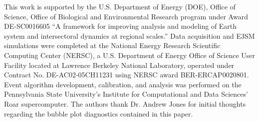 \documentclass[nhess, manuscript]{copernicus}
\begin{document}

\begin{acknowledgements}
This work is supported by the U.S. Department of Energy (DOE), Office of Science, Office of Biological and Environmental Research program under Award DE-SC0016605 ``A framework for improving analysis and modeling of Earth system and intersectoral dynamics at regional scales.'' Data acquisition and E3SM simulations were completed at the National Energy Research Scientific Computing Center (NERSC), a U.S. Department of Energy Office of Science User Facility located at Lawrence Berkeley National Laboratory, operated under Contract No. DE-AC02-05CH11231 using NERSC award BER-ERCAP0020801. Event algorithm development, calibration, and analysis was performed on the Pennsylvania State University's Institute for Computational and Data Sciences' Roar supercomputer. The authors thank Dr. Andrew Jones for initial thoughts regarding the bubble plot diagnostics contained in this paper.
\end{acknowledgements}


%
%




%
%
%
%
%
\end{document}
